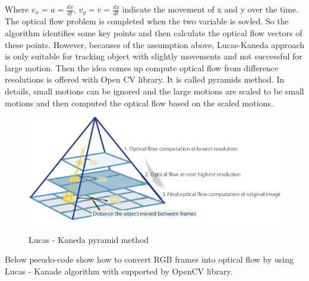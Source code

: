 \documentclass[a4paper, 12pt]{article}
\begin{document}
Where $v_{x} = u = \frac{dx}{dt}$, $v_{y} = v = \frac{dy}{dt}$ indicate the movement of x and y over the time. The optical flow problem is completed when the two variable is sovled. So the algorithm identifies some key points and then calculate the optical flow vectors of these points. However, becauses of the assumption above, Lucas-Kaneda approach is only suitable for tracking object with slightly movements and not successful for large motion. Then the idea comes up compute optical flow from difference resolutions is offered with Open CV library. It is called pyramids method. In details, small motions can be ignored and the large motions are scaled to be small motions and then computed the optical flow based on the scaled motions.

\begin{figure}[H]
    \centering
    \includegraphics[width=\textwidth]{lucas-kanade-pyramid.png}
    \caption{Lucas - Kaneda pyramid method}
\end{figure}

Below pseudo-code show how to convert RGB frames into optical flow by using Lucas - Kanade algorithm with supported by OpenCV library.
\end{document}
